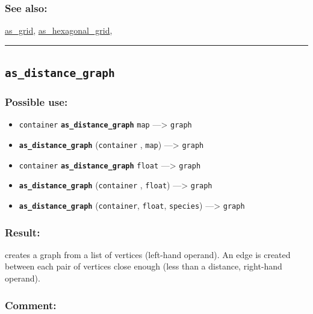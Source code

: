 \documentclass[]{book}
\providecommand{\tightlist}{%
  \setlength{\itemsep}{0pt}\setlength{\parskip}{0pt}}
\theoremstyle{definition}
\theoremstyle{definition}
\theoremstyle{definition}
\theoremstyle{remark}
\begin{document}
\subsubsection{See also:}\label{see-also-29}

\href{operators-a-to-a.html\#as_grid}{as\_grid},
\href{operators-a-to-a.html\#as_hexagonal_grid}{as\_hexagonal\_grid},

\begin{center}\rule{0.5\linewidth}{\linethickness}\end{center}

\subsection{\texorpdfstring{\texttt{as\_distance\_graph}}{as\_distance\_graph}}\label{as_distance_graph}

\subsubsection{Possible use:}\label{possible-use-45}

\begin{itemize}
\tightlist
\item
  \texttt{container} \textbf{\texttt{as\_distance\_graph}} \texttt{map}
  ---\textgreater{} \texttt{graph}
\item
  \textbf{\texttt{as\_distance\_graph}} (\texttt{container} ,
  \texttt{map}) ---\textgreater{} \texttt{graph}
\item
  \texttt{container} \textbf{\texttt{as\_distance\_graph}}
  \texttt{float} ---\textgreater{} \texttt{graph}
\item
  \textbf{\texttt{as\_distance\_graph}} (\texttt{container} ,
  \texttt{float}) ---\textgreater{} \texttt{graph}
\item
  \textbf{\texttt{as\_distance\_graph}} (\texttt{container},
  \texttt{float}, \texttt{species}) ---\textgreater{} \texttt{graph}
\end{itemize}

\subsubsection{Result:}\label{result-44}

creates a graph from a list of vertices (left-hand operand). An edge is
created between each pair of vertices close enough (less than a
distance, right-hand operand).

\subsubsection{Comment:}\label{comment-9}
\end{document}
